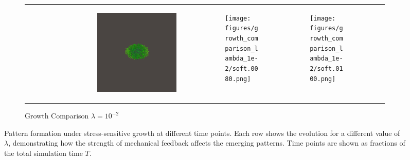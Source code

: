 \documentclass[conference]{IEEEtran}
\newlength{\subfigwidth}
\begin{document}
\begin{figure}
\begin{subfigure}[b]{\textwidth}
\begin{tabular}{r M{\subfigwidth} M{\subfigwidth} M{\subfigwidth} M{\subfigwidth} M{\subfigwidth} }
\begin{subfigure}[b]{\subfigwidth}
            \end{subfigure} &
            \begin{subfigure}[b]{\subfigwidth}
                \includegraphics[width=\textwidth]{figures/growth_comparison_lambda_1e-2/soft.0060.png}
            \end{subfigure} &
            \begin{subfigure}[b]{\subfigwidth}
                \texttt{[image: figures/growth\_comparison\_lambda\_1e-2/soft.0080.png]}
            \end{subfigure} &
            \begin{subfigure}[t]{\subfigwidth}
                \texttt{[image: figures/growth\_comparison\_lambda\_1e-2/soft.0100.png]}
            \end{subfigure}    \\
        \end{tabular}
        \caption{Growth Comparison $\lambda=10^{-2}$}


    \end{subfigure}

    \vspace{1em}

    \caption{Pattern formation under stress-sensitive growth at different time points. Each row shows the evolution for a different value of $\lambda$, demonstrating how the strength of mechanical feedback affects the emerging patterns. Time points are shown as fractions of the total simulation time $T$.}
    \label{fig:pattern_evolution}
\end{figure}
\end{document}
